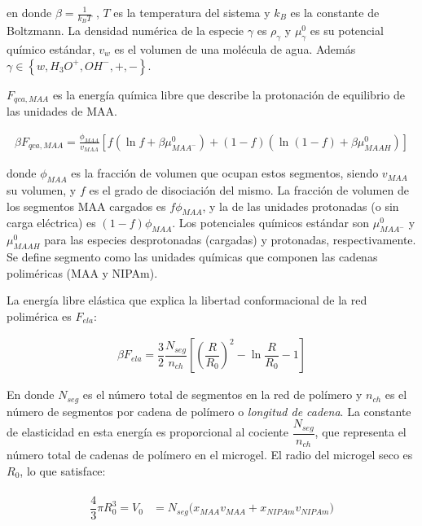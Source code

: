 	\noindent en donde  $\beta=\frac{1}{k_BT}$ , $T$ es la temperatura del sistema  y  $k_B$ es la constante de Boltzmann. La densidad num\'erica de la especie $\gamma$ es $\rho_\gamma$ y $\mu^0_\gamma$ es su potencial qu\'imico est\'andar,  $v_w$ es el volumen de una mol\'ecula de agua. Adem\'as $\gamma \in \left\{ w, H_3O^+, OH^-, +,- \right\}$.
	
	$F_{qca,MAA}$ es la energ\'ia qu\'imica libre que describe la protonaci\'on de equilibrio de las unidades de MAA.
	
	
	\begin{align}
		\beta F_{qca, MAA} =  \frac{\phi_{MAA}}{v_{MAA}} \left[f(\ln f+ \beta\mu^0_{MAA^-}) +(1-f)(\ln (1-f)+\beta\mu^0_{MAAH})\right]
	\end{align}
	
	
	\noindent donde $\phi_{MAA}$ es la fracci\'on de volumen que ocupan estos segmentos, siendo $v_{MAA}$ su volumen, y $f$ es el grado de disociaci\'on del mismo. 
	La fracci\'on de volumen de los segmentos MAA cargados es $f\phi_{MAA}$, y la de las unidades protonadas (o sin carga el\'ectrica) es $(1-f)\phi_{MAA}$.
	Los potenciales qu\'imicos est\'andar son $\mu^0_{MAA^-}$ y $\mu^0_{MAAH}$ para las especies desprotonadas (cargadas) y protonadas, respectivamente.
	Se define segmento como las unidades qu\'imicas que componen las cadenas polim\'ericas (MAA y NIPAm).
	
	
	La energ\'ia libre el\'astica que explica la libertad conformacional de la red polim\'erica es $F_{ela}$: 
	
	\begin{align}
		\beta F_{ela} = \dfrac{3}{2}\dfrac{N_{seg}}{n_{ch} }\left[\left(\dfrac{R}{R_0}\right)^2 - \ln\dfrac{R}{R_0} -1\right]
	\end{align}
	
	En donde $N_{seg}$ es el n\'umero total de segmentos en la red de pol\'imero y $n_{ch}$ es el n\'umero de segmentos por cadena de pol\'imero o \emph{longitud de cadena}.
	La constante de elasticidad en esta energ\'ia es proporcional al cociente $\dfrac{N_{seg}}{n_{ch}}$, que representa el n\'umero total de cadenas de pol\'imero en el microgel.
	El radio del microgel seco es $R_0$, lo que satisface:
	
	\begin{align}
		\begin{aligned} 
			\dfrac{4}{3}\pi R_0^3=V_0&=N_{seg}\Big( x_{MAA} v_{MAA} +x_{NIPAm} v_{NIPAm}\Big)
		\end{aligned}
	\end{align}
	
